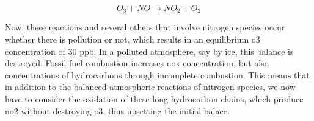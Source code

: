 \begin{equation}
    \label{eq:no2_formation}
    O_3 + NO \rightarrow NO_2 + O_2
\end{equation}

Now, these reactions and several others that involve nitrogen species
occur whether there is pollution or not,  which results in an
equilibrium \gls{o3} concentration of 30 ppb. In a polluted atmosphere,
say by \gls{ice}, this balance is destroyed. Fossil fuel combustion
increases \gls{nox} concentration, but also concentrations of
hydrocarbons through incomplete combustion. This means that in addition
to the balanced atmospheric reactions of nitrogen species, we now have
to consider the oxidation of these long hydrocarbon chains, which
produce \gls{no2} without destroying \gls{o3}, thus upsetting the
initial balace.
